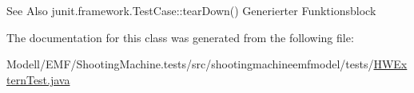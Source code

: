 \begin{DoxySeeAlso}{See Also}
junit.\-framework.\-Test\-Case\-::tear\-Down() Generierter Funktionsblock 
\end{DoxySeeAlso}


The documentation for this class was generated from the following file\-:\begin{DoxyCompactItemize}
\item 
Modell/\-E\-M\-F/\-Shooting\-Machine.\-tests/src/shootingmachineemfmodel/tests/\hyperlink{_h_w_extern_test_8java}{H\-W\-Extern\-Test.\-java}\end{DoxyCompactItemize}
